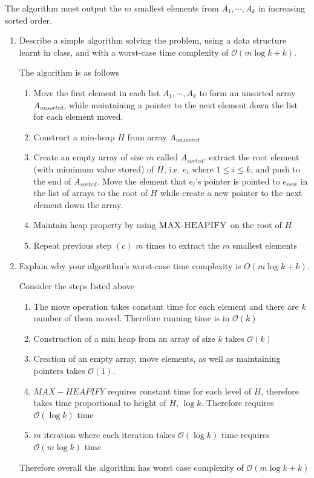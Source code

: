 \documentclass[11pt]{article}
\begin{document}
The algorithm must output the $m$ smallest elements from $A_1, \cdots, A_k$ in increasing sorted order.

\begin{enumerate}
  \item Describe a simple algorithm solving the problem, using a data structure learnt in class, and with a worst-case time complexity of $\mathcal{O}(m\log k + k)$.
  \begin{solution}
    The algorithm is as follows
    \begin{enumerate}
      \item Move the first element in each list $A_1, \cdots, A_k$ to form an unsorted array $A_{unsorted}$, while maintaining a pointer to the next element down the list for each element moved.
      \item Construct a min-heap $H$ from array $A_{unsorted}$
      \item Create an empty array of size $m$ called $A_{sorted}$. extract the root element (with mimimum value stored) of $H$, i.e. $e_i$ where $1\leq i\leq k$, and push to the end of $A_{sorted}$. Move the element that $e_i$'s pointer is pointed to $e_{new}$ in the list of arrays to the root of $H$ while create a new pointer to the next element down the array.
      \item Maintain heap property by using $\textsc{MAX-HEAPIFY}$ on the root of $H$
      \item Repeat previous step $(c)$ $m$ times to extract the $m$ smallest elements
    \end{enumerate}

  \end{solution}
  \item Explain why your algorithm’s worst-case time complexity is $O(m \log k + k)$.

  Consider the steps listed above
  \begin{enumerate}
    \item The move operation takes constant time for each element and there are $k$ number of them moved. Therefore running time is in $\mathcal{O}(k)$
    \item Construction of a min heap from an array of size $k$ takes $\mathcal{O}(k)$
    \item Creation of an empty array, move elements, as well as maintaining pointers takes $\mathcal{O}(1)$.
    \item $MAX-HEAPIFY$ requires constant time for each level of $H$, therefore takes time proportional to height of $H$, $\log k$. Therefore requires $\mathcal{O}(\log k)$ time
    \item $m$ iteration where each iteration takes $\mathcal{O}(\log k)$ time requires $\mathcal{O}(m\log k)$ time
  \end{enumerate}
  Therefore overall the algorithm has worst case complexity of $\mathcal{O}(m\log k + k)$
\end{enumerate}
\end{document}
